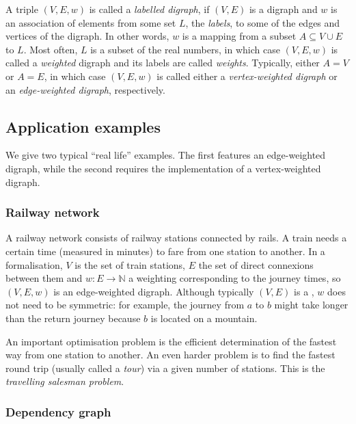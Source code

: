 \documentclass[12pt]{article}
\newcommand{\mbb}{\mathbb}
\begin{document}
A triple $(V,E,w)$ is called a \emph{labelled digraph}, if $(V,E)$ is a
digraph and $w$ is an association of elements from some set $L$, the
\emph{labels}, to some of the edges and vertices of the digraph. In
other words, $w$ is a mapping from a subset $A\subseteq V\cup E$ to
$L$. Most often, $L$ is a subset of the real numbers, in which case
$(V,E,w)$ is called a \emph{weighted} digraph and its labels are
called \emph{weights}. Typically, either $A=V$ or $A=E$, in which case
$(V,E,w)$ is called either a \emph{vertex-weighted digraph} or an
\emph{edge-weighted digraph}, respectively.

\subsection*{Application examples}

We give two typical ``real life'' examples. The first features an
edge-weighted digraph, while the second requires the implementation of
a vertex-weighted digraph.

\subsubsection*{Railway network}

A railway network consists of railway stations connected by rails. A
train needs a certain time (measured in minutes) to fare from one
station to another. In a formalisation, $V$ is the set of train
stations, $E$ the set of direct connexions between them and $w\colon
E\to\mbb{N}$ a weighting corresponding to the journey times, so
$(V,E,w)$ is an edge-weighted digraph. Although typically $(V,E)$ is a
, $w$ does not need to be symmetric: for example, the
journey from $a$ to $b$ might take longer than the return journey
because $b$ is located on a mountain.

An important optimisation problem is the efficient determination of
the fastest way from one station to another. An even harder problem is
to find the fastest round trip (usually called a \emph{tour}) via a
given number of stations. This is the \emph{travelling salesman
problem}.

\subsubsection*{Dependency graph}
\end{document}
